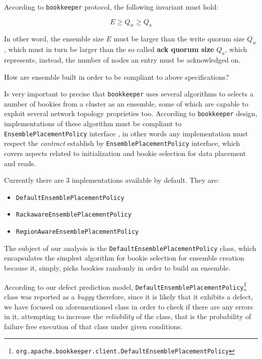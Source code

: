 \documentclass[conference, onecolumn]{IEEEtran}
\begin{document}
According to \texttt{bookkeeper} protocol\cite{BookKeeperProtocol}, the following invariant must hold:

\begin{equation}
E \geqslant Q_w \geqslant Q_a
\end{equation}

In other word, the ensemble size $E$ must be larger than the write quorum size $Q_w$, which must in turn be larger than the so called \textbf{ack quorum size} $Q_a$, which represents, instead, the number of nodes an entry must be acknowledged on. 

How are ensemble built in order to be compliant to above specifications? 

Is very important to precise that \texttt{bookkeeper} uses several algorithms to selects a number of bookies from a cluster as an ensemble, some of which are capable to exploit several network topology proprieties too. According to \texttt{bookkeeper} design, implementations of these algorithm must be compliant to \texttt{EnsemblePlacementPolicy} interface \cite{EnsemblePlacementPolicy}, in other words any implementation must respect the \textit{contract} establish by \texttt{EnsemblePlacementPolicy} interface, which covers aspects related to initialization and bookie selection for data placement and reads\cite{EnsemblePlacementPolicy}. 

Currently there are 3 implementations available by default. They are:
\begin{itemize}
\item \texttt{DefaultEnsemblePlacementPolicy}
\item \texttt{RackawareEnsemblePlacementPolicy}
\item \texttt{RegionAwareEnsemblePlacementPolicy}
\end{itemize}

The subject of our analysis is the \texttt{DefaultEnsemblePlacementPolicy} class, which encapsulates the simplest algorithm for bookie selection for ensemble creation because it, simply, picks bookies randomly in order to build an ensemble.

According to our defect prediction model, \texttt{DefaultEnsemblePlacementPolicy}\footnote{\texttt{org.apache.bookkeeper.client.DefaultEnsemblePlacementPolicy}} class was reported as a \textit{buggy} therefore, since it is likely that it exhibits a defect, we have focused on aforementioned class in order to check if there are any errors in it, attempting to increase the \textit{reliability} of the class, that is the probability of failure free execution of that class under given conditions.
\end{document}

